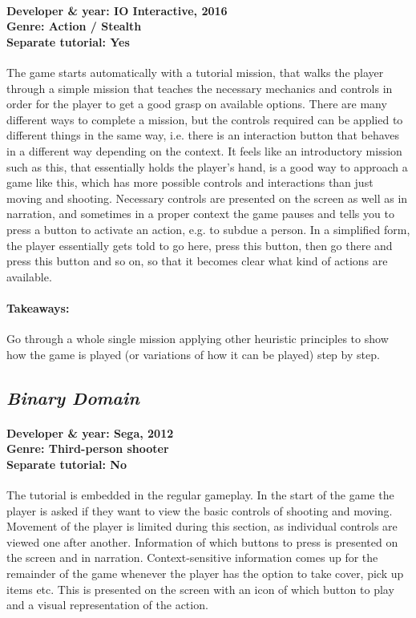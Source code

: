 \paragraph{Developer \& year: IO Interactive, 2016 \\ Genre: Action / Stealth \\ Separate tutorial: Yes \\}
The game starts automatically with a tutorial mission, that walks the player through a simple mission that teaches the necessary mechanics and controls in order for the player to get a good grasp on available options. There are many different ways to complete a mission, but the controls required can be applied to different things in the same way, i.e. there is an interaction button that behaves in a different way depending on the context. It feels like an introductory mission such as this, that essentially holds the player's hand, is a good way to approach a game like this, which has more possible controls and interactions than just moving and shooting. Necessary controls are presented on the screen as well as in narration, and sometimes in a proper context the game pauses and tells you to press a button to activate an action, e.g. to subdue a person. In a simplified form, the player essentially gets told to go here, press this button, then go there and press this button and so on, so that it becomes clear what kind of actions are available.
\paragraph{Takeaways:}
Go through a whole single mission applying other heuristic principles to show how the game is played (or variations of how it can be played) step by step.

\subsection{\textit{Binary Domain}}
\paragraph{Developer \& year: Sega, 2012 \\ Genre: Third-person shooter \\ Separate tutorial: No \\} 
The tutorial is embedded in the regular gameplay. In the start of the game the player is asked if they want to view the basic controls of shooting and moving. Movement of the player is limited during this section, as individual controls are viewed one after another. Information of which buttons to press is presented on the screen and in narration. Context-sensitive information comes up for the remainder of the game whenever the player has the option to take cover, pick up items etc. This is presented on the screen with an icon of which button to play and a visual representation of the action.
